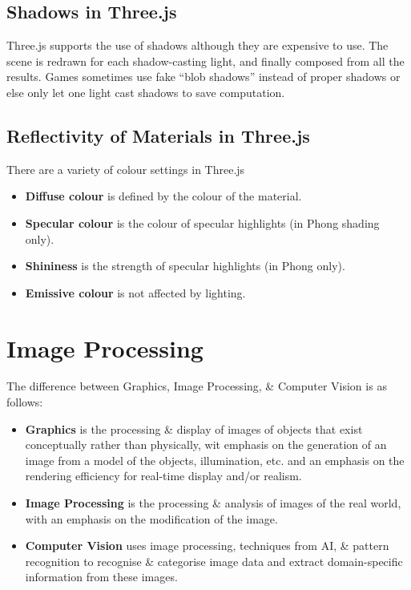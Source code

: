 \documentclass[a4paper,11pt]{article}
\begin{document}
\subsection{Shadows in Three.js}
Three.js supports the use of shadows although they are expensive to use.
The scene is redrawn for each shadow-casting light, and finally composed from all the results.
Games sometimes use fake ``blob shadows'' instead of proper shadows or else only let one light cast shadows to save computation.

\subsection{Reflectivity of Materials in Three.js}
There are a variety of colour settings in Three.js
\begin{itemize}
    \item   \textbf{Diffuse colour} is defined by the colour of the material.
    \item   \textbf{Specular colour} is the colour of specular highlights (in Phong shading only).
    \item   \textbf{Shininess} is the strength of specular highlights (in Phong only).
    \item   \textbf{Emissive colour} is not affected by lighting.
\end{itemize}

\section{Image Processing}
The difference between Graphics, Image Processing, \& Computer Vision is as follows:
\begin{itemize}
    \item   \textbf{Graphics} is the processing \& display of images of objects that exist conceptually rather than physically, wit emphasis on the generation of an image from a model of the objects, illumination, etc. and an emphasis on the rendering efficiency for real-time display and/or realism.

    \item   \textbf{Image Processing} is the processing \& analysis of images of the real world, with an emphasis on the modification of the image.

    \item   \textbf{Computer Vision} uses image processing, techniques from AI, \& pattern recognition to recognise \& categorise image data and extract domain-specific information from these images.
\end{itemize}
\end{document}
